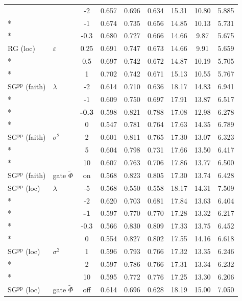 \begin{longtable}{@{}l l c c c c c c c@{}}
 &  & {-}2 & 0.657 & 0.696 & 0.634 & 15.31 & 10.80 & 5.885 \\*
 &  & {-}1 & 0.674 & 0.735 & 0.656 & 14.85 & 10.13 & 5.731 \\*
 &  & {-}0.3 & 0.680 & 0.727 & 0.666 & 14.66 & 9.87 & 5.675 \\
\midrule
RG (loc) & $\varepsilon$ & 0.25 & 0.691 & 0.747 & 0.673 & 14.66 & 9.91 & 5.659 \\*
 &  & 0.5 & 0.697 & 0.742 & 0.672 & 14.87 & 10.19 & 5.705 \\*
 &  & 1 & 0.702 & 0.742 & 0.671 & 15.13 & 10.55 & 5.767 \\
\midrule
SG$^{\mathrm{pp}}$ (faith) & $\lambda$ & {-}2 & 0.614 & 0.710 & 0.636 & 18.17 & 14.83 & 6.941 \\*
 &  & {-}1 & 0.609 & 0.750 & 0.697 & 17.91 & 13.87 & 6.517 \\*
 &  & \textbf{{-}0.3} & 0.598 & 0.821 & 0.788 & 17.08 & 12.98 & 6.278 \\*
 &  & 0 & 0.547 & 0.781 & 0.764 & 17.63 & 14.35 & 6.789 \\
\midrule
SG$^{\mathrm{pp}}$ (faith) & $\sigma^2$ & 2 & 0.601 & 0.811 & 0.765 & 17.30 & 13.07 & 6.323 \\*
 &  & 5 & 0.604 & 0.798 & 0.731 & 17.66 & 13.50 & 6.417 \\*
 &  & 10 & 0.607 & 0.763 & 0.706 & 17.86 & 13.77 & 6.500 \\
\midrule
SG$^{\mathrm{pp}}$ (faith) & gate $\tilde\Phi$ & on & 0.568 & 0.823 & 0.805 & 17.30 & 13.74 & 6.428 \\
\midrule
SG$^{\mathrm{pp}}$ (loc) & $\lambda$ & {-}5 & 0.568 & 0.550 & 0.558 & 18.17 & 14.31 & 7.509 \\*
 &  & {-}2 & 0.620 & 0.703 & 0.681 & 17.84 & 13.63 & 6.404 \\*
 &  & \textbf{{-}1} & 0.597 & 0.770 & 0.770 & 17.28 & 13.32 & 6.217 \\*
 &  & {-}0.3 & 0.566 & 0.830 & 0.809 & 17.33 & 13.75 & 6.452 \\*
 &  & 0 & 0.554 & 0.827 & 0.802 & 17.55 & 14.16 & 6.618 \\
\midrule
SG$^{\mathrm{pp}}$ (loc) & $\sigma^2$ & 1 & 0.596 & 0.793 & 0.766 & 17.32 & 13.35 & 6.246 \\*
 &  & 2 & 0.597 & 0.786 & 0.766 & 17.31 & 13.34 & 6.232 \\*
 &  & 10 & 0.595 & 0.772 & 0.776 & 17.25 & 13.30 & 6.206 \\
\midrule
SG$^{\mathrm{pp}}$ (loc) & gate $\tilde\Phi$ & off & 0.614 & 0.696 & 0.628 & 18.19 & 15.00 & 7.050 \\
\end{longtable}
